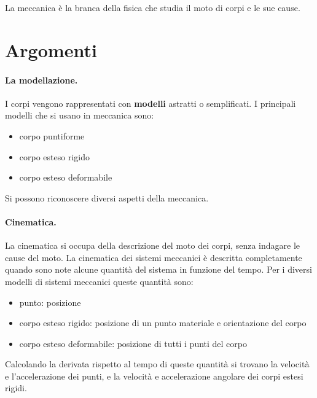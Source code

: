 
\begin{definition}[Meccanica] La meccanica è la branca della fisica che studia il moto di corpi e le sue cause.
\end{definition}

\section*{Argomenti}
\paragraph{La modellazione.} I corpi vengono rappresentati con \textbf{modelli} astratti o semplificati. I principali modelli che si usano in meccanica sono:
\begin{itemize}
    \item corpo puntiforme
    \item corpo esteso rigido
    \item corpo esteso deformabile
\end{itemize}

\noindent
Si possono riconoscere diversi aspetti della meccanica.

\vspace{8pt}
\paragraph{Cinematica.} La cinematica si occupa della descrizione del moto dei corpi, senza indagare le cause del moto. La cinematica dei sistemi meccanici è descritta completamente quando sono note alcune quantità del sistema in funzione del tempo. Per i diversi modelli di sistemi meccanici queste quantità sono:
\begin{itemize}
    \item punto: posizione
    \item corpo esteso rigido: posizione di un punto materiale e orientazione del corpo
    \item corpo esteso deformabile: posizione di tutti i punti del corpo
\end{itemize}
Calcolando la derivata rispetto al tempo di queste quantità si trovano la velocità e l'accelerazione dei punti, e la velocità e accelerazione angolare dei corpi estesi rigidi.

\vspace{8pt}
